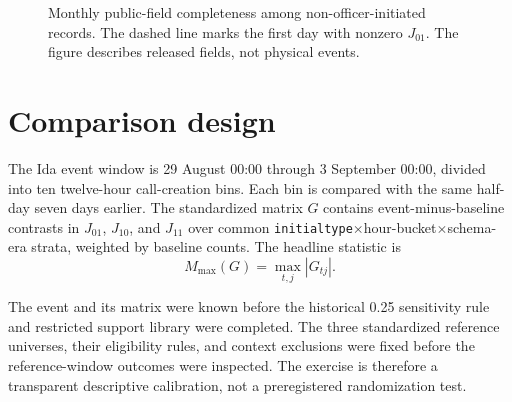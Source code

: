 \documentclass[11pt]{article}
\begin{document}
\begin{figure}[t]
\centering
{}
\caption{Monthly public-field completeness among non-officer-initiated records. The dashed line marks the first day with nonzero $J_{01}$. The figure describes released fields, not physical events.}
\label{fig:monthly}
\end{figure}

\section{Comparison design}

The Ida event window is 29 August 00:00 through 3 September 00:00, divided into ten twelve-hour call-creation bins. Each bin is compared with the same half-day seven days earlier. The standardized matrix $G$ contains event-minus-baseline contrasts in $J_{01}$, $J_{10}$, and $J_{11}$ over common \texttt{initialtype}$\times$hour-bucket$\times$schema-era strata, weighted by baseline counts. The headline statistic is
\begin{equation}
M_{\max}(G)=\max_{t,j}|G_{tj}|.
\end{equation}

The event and its matrix were known before the historical 0.25 sensitivity rule and restricted support library were completed. The three standardized reference universes, their eligibility rules, and context exclusions were fixed before the reference-window outcomes were inspected. The exercise is therefore a transparent descriptive calibration, not a preregistered randomization test.
\end{document}

